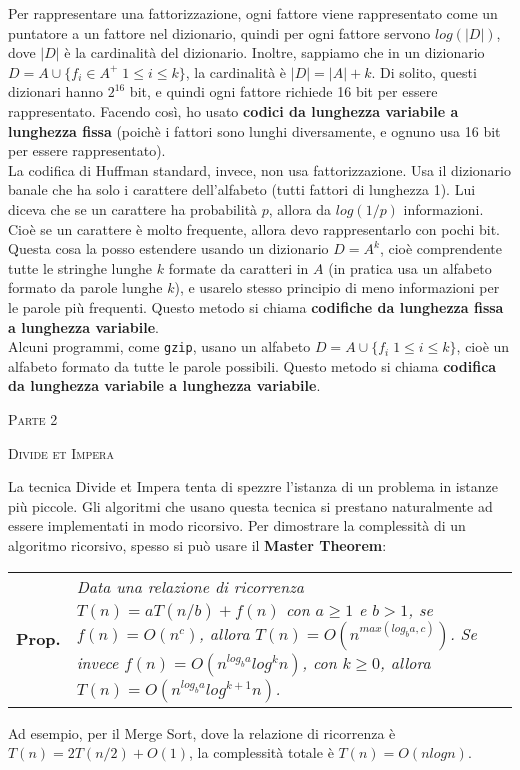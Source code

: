 \documentclass[a4paper,10pt]{article} %
\newcommand{\msection}[1]{%
    {\newpage\bigbreak \bigbreak \par \hfil \huge \textsc {#1}}\par}
\renewcommand{\b}[1]{%
    {\textbf{#1}}}
\renewcommand{\t}[1]{%
    {\texttt{#1}}}
\newcommand{\mprop}[1]{%
    {\smallbreak\par\begin{tabular}{ll} \textbf{Prop.} & \begin{minipage}[t]{0.8\columnwidth}\emph  {#1}\end{minipage}\tabularnewline \end{tabular}}\smallskip\par}
\begin{document}
\bigskip
Per rappresentare una fattorizzazione, ogni fattore viene rappresentato come un puntatore a un fattore nel dizionario, quindi per ogni fattore servono $log(|D|)$, dove $|D|$ è la cardinalità del dizionario. Inoltre, sappiamo che in un dizionario $D = A \cup \{f_i \in A^+ \; 1 \leq i \leq k\}$, la cardinalità è $|D| = |A| + k$. Di solito, questi dizionari hanno $2^16$ bit, e quindi ogni fattore richiede 16 bit per essere rappresentato. Facendo così, ho usato \b{codici da lunghezza variabile a lunghezza fissa} (poichè i fattori sono lunghi diversamente, e ognuno usa 16 bit per essere rappresentato).\\
La codifica di Huffman standard, invece, non usa fattorizzazione. Usa il dizionario banale che ha solo i carattere dell'alfabeto (tutti fattori di lunghezza 1). Lui diceva che se un carattere ha probabilità $p$, allora da $log(1/p)$ informazioni. Cioè se un carattere è molto frequente, allora devo rappresentarlo con pochi bit. \\
Questa cosa la posso estendere usando un dizionario $D = A^k$, cioè comprendente tutte le stringhe lunghe $k$ formate da caratteri in $A$ (in pratica usa un alfabeto formato da parole lunghe $k$), e usarelo stesso principio di meno informazioni per le parole più frequenti. Questo metodo si chiama \b{codifiche da lunghezza fissa a lunghezza variabile}.\\
Alcuni programmi, come \t{gzip}, usano un alfabeto $D = A \cup \{f_i \; 1 \leq i \leq k\}$, cioè un alfabeto formato da tutte le parole possibili. Questo metodo si chiama \b{codifica da lunghezza variabile a lunghezza variabile}.\\




\msection{Parte 2}

\msection{Divide et Impera}


La tecnica Divide et Impera tenta di spezzre l'istanza di un problema in istanze più piccole. Gli algoritmi che usano questa tecnica si prestano naturalmente ad essere implementati in modo ricorsivo.  Per dimostrare la complessità di un algoritmo ricorsivo, spesso si può usare il \b{Master Theorem}:

\mprop{Data una relazione di ricorrenza $T(n) = aT(n/b) + f(n)$ con $a \geq 1$ e $b > 1$, se $f(n) = O(n^c)$, allora $T(n) = O(n^{max(log_b a, c)})$. Se invece $f(n) = O(n^{log_b a} log^k n)$, con $k \geq 0$, allora $T(n) = O(n^{log_b a} log^{k + 1} n)$.}

Ad esempio, per il Merge Sort, dove la relazione di ricorrenza è $T(n) = 2T(n/2) + O(1)$, la complessità totale è $T(n) = O(nlogn)$.
\end{document}

